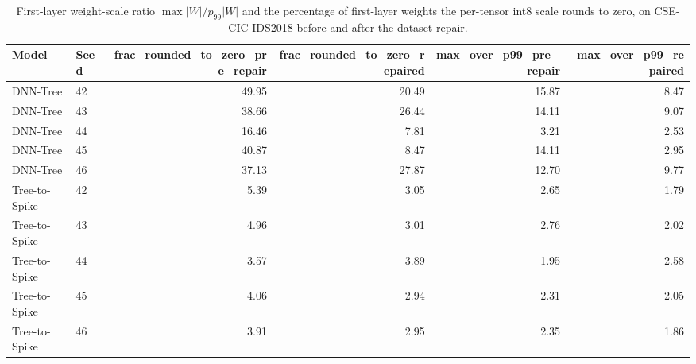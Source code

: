 \begin{table}[t]\centering\small
\caption{First-layer weight-scale ratio $\max|W|/p_{99}|W|$ and the percentage of first-layer weights the per-tensor int8 scale rounds to zero, on CSE-CIC-IDS2018 before and after the dataset repair.}
\label{tab:fc1ratio}
\begin{tabular}{llrrrr}
\toprule
Model & Seed & frac_rounded_to_zero_pre_repair & frac_rounded_to_zero_repaired & max_over_p99_pre_repair & max_over_p99_repaired \\
\midrule
DNN-Tree & 42 & 49.95 & 20.49 & 15.87 & 8.47 \\
DNN-Tree & 43 & 38.66 & 26.44 & 14.11 & 9.07 \\
DNN-Tree & 44 & 16.46 & 7.81 & 3.21 & 2.53 \\
DNN-Tree & 45 & 40.87 & 8.47 & 14.11 & 2.95 \\
DNN-Tree & 46 & 37.13 & 27.87 & 12.70 & 9.77 \\
Tree-to-Spike & 42 & 5.39 & 3.05 & 2.65 & 1.79 \\
Tree-to-Spike & 43 & 4.96 & 3.01 & 2.76 & 2.02 \\
Tree-to-Spike & 44 & 3.57 & 3.89 & 1.95 & 2.58 \\
Tree-to-Spike & 45 & 4.06 & 2.94 & 2.31 & 2.05 \\
Tree-to-Spike & 46 & 3.91 & 2.95 & 2.35 & 1.86 \\
\bottomrule
\end{tabular}
\end{table}
